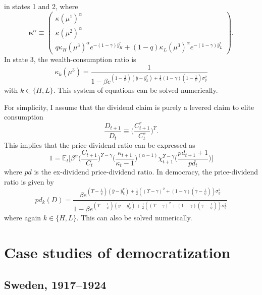 \documentclass[12pt]{article}
\numberwithin{equation}{section}
\begin{document}
in states 1 and 2, where
\begin{equation}
\boldsymbol{\kappa}^{\alpha}\equiv\begin{pmatrix}\kappa(\mu^{1})^{\alpha}\\
\kappa(\mu^{2})^{\alpha}\\
q \kappa_H(\mu^{3})^{\alpha} e^{-(1-\gamma)\bar{y}^r_H} + (1-q) \kappa_L(\mu^{3})^{\alpha} e^{-(1-\gamma)\bar{y}^r_L} 
\end{pmatrix}.
\end{equation}
In state 3, the wealth-consumption ratio is
$$
\kappa_k(\mu^{3})=\frac{1}{1-\beta e^{(1-\frac{1}{\psi})(\bar{y}-\bar{y}^r_k)+\frac{1}{2}(1-\gamma)(1-\frac{1}{\psi})\sigma_y^{2}}}
$$
with $k\in\{H,L\}$. This system of equations can be solved numerically.

For simplicity, I assume that the dividend claim is purely a levered claim to elite consumption
\begin{equation*}
\frac{D_{t+1}}{D_{t}} \equiv \bigg(\frac{C^r_{t+1}}{C^r_{t}}\bigg)^{\Upsilon}.
\end{equation*}
This implies that the price-dividend ratio can be expressed as
\begin{equation}
1=\mathbb{E}_t\bigg[\beta^{\alpha}\bigg(\frac{C_{t+1}}{C_{t}}\bigg)^{\Upsilon-\gamma}\bigg(\frac{\kappa_{t+1}}{\kappa_t - 1}\bigg)^{(\alpha-1)} \chi^{\Upsilon-\gamma}_{t+1} \bigg(\frac{pd_{t+1}+1}{pd_{t}}\bigg)\bigg]
\end{equation}
where $pd$ is the ex-dividend price-dividend ratio. In democracy, the price-dividend ratio is given by
\begin{equation}
pd_k(D) = \frac{\beta e^{(\Upsilon-\frac{1}{\psi})(\bar{y}-\bar{y}^r_k)+\frac{1}{2}((\Upsilon-\gamma)^2 + (1-\gamma)(\gamma-\frac{1}{\psi}))\sigma_y^{2}}}{1-\beta e^{(\Upsilon-\frac{1}{\psi})(\bar{y}-\bar{y}^r_k)+\frac{1}{2}((\Upsilon-\gamma)^2 + (1-\gamma)(\gamma-\frac{1}{\psi}))\sigma_y^{2}}}
\end{equation}
where again $k\in\{H,L\}$. This can also be solved numerically.


\section{Case studies of democratization}\label{section:case_studies}

\subsection{Sweden, 1917--1924}\label{section:SWEDEN}
\end{document}
